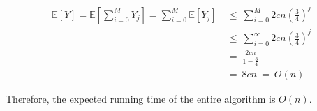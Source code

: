 \documentclass[twoside,11pt]{homework}
\begin{document}
\begin{enumerate}[\bf (a)]
\begin{align*}
\mathbb{E}[Y] = \mathbb{E}\left[\sum_{i=0}^{M} Y_j \right] = \sum_{i=0}^{M} \mathbb{E}\left[ Y_j \right] \ &\leq \ \sum_{i=0}^{M} 2cn\left(\frac{3}{4}\right)^j \\[0.4em]
& \leq \ \sum_{i=0}^{\infty} 2cn\left(\frac{3}{4}\right)^j \\[0.5em]  
& = \  \frac{2cn}{1 - \frac{3}{4}}\\[0.5em] 
&= \ 8cn \ = \ O(n)
\end{align*}

Therefore, the expected running time of the entire algorithm is $O(n)$.




\end{enumerate}
\end{document}
